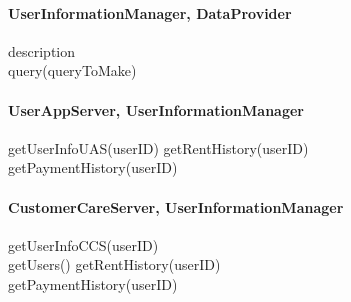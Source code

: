 \paragraph{UserInformationManager, DataProvider} 
description \\
query(queryToMake)

\paragraph{UserAppServer, UserInformationManager}
getUserInfoUAS(userID)
getRentHistory(userID) \\
getPaymentHistory(userID) \\

\paragraph{CustomerCareServer, UserInformationManager}
getUserInfoCCS(userID) \\
getUsers()
getRentHistory(userID) \\
getPaymentHistory(userID) \\










